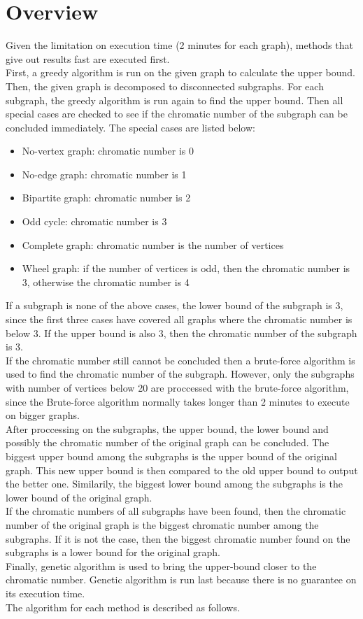 \documentclass[a4paper]{report}
\begin{document}
	\section{Overview}
	Given the limitation on execution time (2 minutes for each graph), methods that give out results fast are executed first. \\
	First, a greedy algorithm is run on the given graph to calculate the upper bound. Then, the given graph is decomposed to disconnected subgraphs. For each subgraph, the greedy algorithm is run again to find the upper bound. Then all special cases are checked to see if the chromatic number of the subgraph can be concluded immediately. The special cases are listed below: 
	\begin{itemize}
		\item No-vertex graph: chromatic number is 0
		\item No-edge graph: chromatic number is 1
		\item Bipartite graph: chromatic number is 2
		\item Odd cycle: chromatic number is 3
		\item Complete graph: chromatic number is the number of vertices
		\item Wheel graph: if the number of vertices is odd, then the chromatic number is 3, otherwise the chromatic number is 4
	\end{itemize}
	If a subgraph is none of the above cases, the lower bound of the subgraph is 3, since the first three cases have covered all graphs where the chromatic number is below 3. If the upper bound is also 3, then the chromatic number of the subgraph is 3. \\
	If the chromatic number still cannot be concluded then a brute-force algorithm is used to find the chromatic number of the subgraph. However, only the subgraphs with number of vertices below 20 are proccessed with the brute-force algorithm, since the Brute-force algorithm normally takes longer than 2 minutes to execute on bigger graphs. \\
	After proccessing on the subgraphs, the upper bound, the lower bound and possibly the chromatic number of the original graph can be concluded. The biggest upper bound among the subgraphs is the upper bound of the original graph. This new upper bound is then compared to the old upper bound to output the better one. Similarily, the biggest lower bound among the subgraphs is the lower bound of the original graph. \\
	If the chromatic numbers of all subgraphs have been found, then the chromatic number of the original graph is the biggest chromatic number among the subgraphs. If it is not the case, then the biggest chromatic number found on the subgraphs is a lower bound for the original graph.\\
	Finally, genetic algorithm is used to bring the upper-bound closer to the chromatic number. Genetic algorithm is run last because there is no guarantee on its execution time.\\
	The algorithm for each method is described as follows.
	
\end{document}
